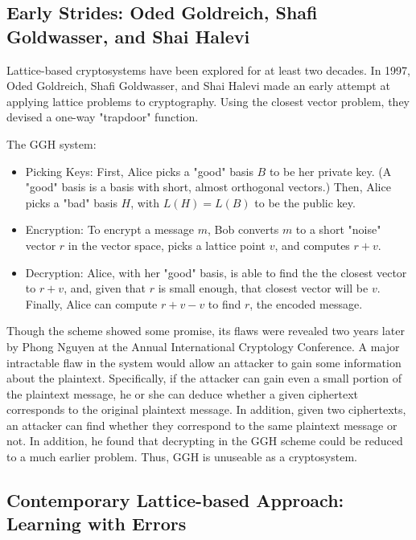 \documentclass{article}
\begin{document}
\subsection{Early Strides: Oded Goldreich, Shafi Goldwasser, and Shai Halevi}

Lattice-based cryptosystems have been explored for at least two decades. In 1997, Oded Goldreich, Shafi Goldwasser, and Shai Halevi made an early attempt at applying lattice problems to cryptography. Using the closest vector problem, they devised a one-way "trapdoor" function.\cite{goldreich97}

The GGH system:\cite{goldreich97}

\begin{itemize}
	\item Picking Keys: First, Alice picks a "good" basis $ B $ to be her private key. (A "good" basis is a basis with short, almost orthogonal vectors.) Then, Alice picks a "bad" basis $ H $, with $ L(H) = L(B) $ to be the public key.
	\item Encryption: To encrypt a message $ m $, Bob converts $ m $ to a short "noise" vector $ r $ in the vector space, picks a lattice point $ v $, and computes $ r + v $.
	\item Decryption: Alice, with her "good" basis, is able to find the the closest vector to $ r + v $, and, given that $ r $ is small enough, that closest vector will be $ v $. Finally, Alice can compute $ r + v - v $ to find $ r $, the encoded message.
\end{itemize}

Though the scheme showed some promise, its flaws were revealed two years later by Phong Nguyen at the Annual International Cryptology Conference. A major intractable flaw in the system would allow an attacker to gain some information about the plaintext. Specifically, if the attacker can gain even a small portion of the plaintext message, he or she can deduce whether a given ciphertext corresponds to the original plaintext message. In addition, given two ciphertexts, an attacker can find whether they correspond to the same plaintext message or not. In addition, he found that decrypting in the GGH scheme could be reduced to a much earlier problem. Thus, GGH is unuseable as a cryptosystem.\cite{nguyen99}

\subsection{Contemporary Lattice-based Approach: Learning with Errors}
\end{document}
